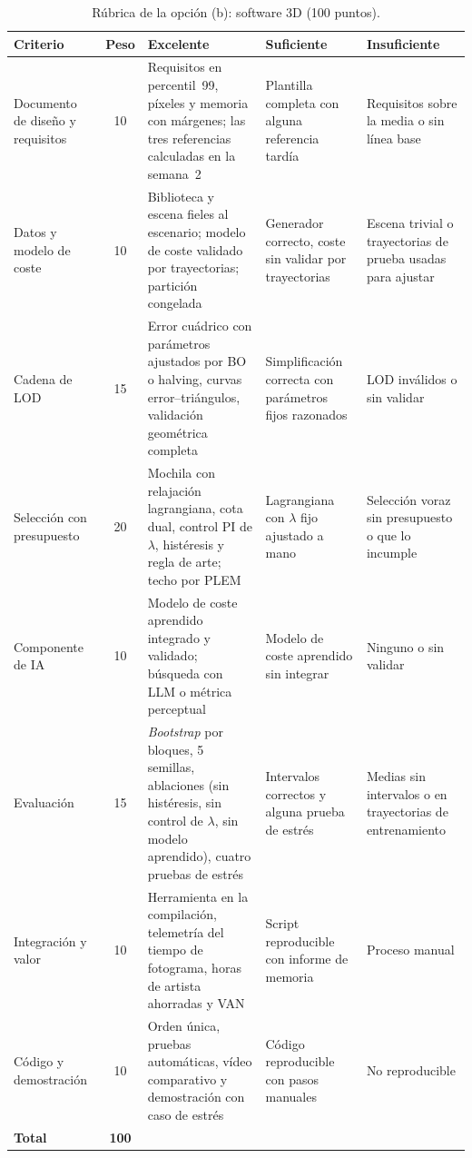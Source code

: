 \begin{table}[p]
\centering\footnotesize
\caption{Rúbrica de la opción (b): software 3D (100 puntos).}\label{tab:rubrica-b}
\begin{tabularx}{\textwidth}{@{}>{\raggedright\arraybackslash}p{2.5cm}c>{\raggedright\arraybackslash}X>{\raggedright\arraybackslash}X>{\raggedright\arraybackslash}X@{}}
\toprule
Criterio & Peso & Excelente & Suficiente & Insuficiente \\
\midrule
Documento de diseño y requisitos & 10 & Requisitos en percentil~99, píxeles y memoria con márgenes; las tres referencias calculadas en la semana~2 & Plantilla completa con alguna referencia tardía & Requisitos sobre la media o sin línea base \\
\addlinespace
Datos y modelo de coste & 10 & Biblioteca y escena fieles al escenario; modelo de coste validado por trayectorias; partición congelada & Generador correcto, coste sin validar por trayectorias & Escena trivial o trayectorias de prueba usadas para ajustar \\
\addlinespace
Cadena de LOD & 15 & Error cuádrico con parámetros ajustados por BO o halving, curvas error--triángulos, validación geométrica completa & Simplificación correcta con parámetros fijos razonados & LOD inválidos o sin validar \\
\addlinespace
Selección con presupuesto & 20 & Mochila con relajación lagrangiana, cota dual, control PI de $\lambda$, histéresis y regla de arte; techo por PLEM & Lagrangiana con $\lambda$ fijo ajustado a mano & Selección voraz sin presupuesto o que lo incumple \\
\addlinespace
Componente de IA & 10 & Modelo de coste aprendido integrado y validado; búsqueda con LLM o métrica perceptual & Modelo de coste aprendido sin integrar & Ninguno o sin validar \\
\addlinespace
Evaluación & 15 & \emph{Bootstrap} por bloques, 5 semillas, ablaciones (sin histéresis, sin control de $\lambda$, sin modelo aprendido), cuatro pruebas de estrés & Intervalos correctos y alguna prueba de estrés & Medias sin intervalos o en trayectorias de entrenamiento \\
\addlinespace
Integración y valor & 10 & Herramienta en la compilación, telemetría del tiempo de fotograma, horas de artista ahorradas y VAN & Script reproducible con informe de memoria & Proceso manual \\
\addlinespace
Código y demostración & 10 & Orden única, pruebas automáticas, vídeo comparativo y demostración con caso de estrés & Código reproducible con pasos manuales & No reproducible \\
\midrule
\textbf{Total} & \textbf{100} & & & \\
\bottomrule
\end{tabularx}
\end{table}

